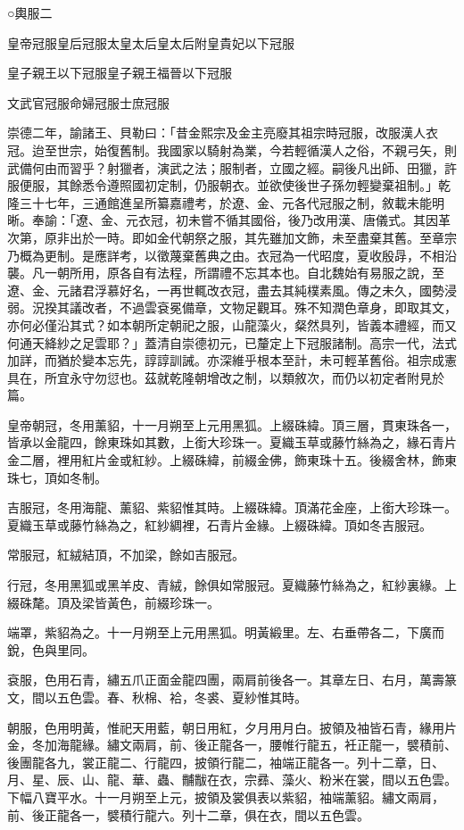 
\begin{pinyinscope}
○輿服二

皇帝冠服皇后冠服太皇太后皇太后附皇貴妃以下冠服

皇子親王以下冠服皇子親王福晉以下冠服

文武官冠服命婦冠服士庶冠服

崇德二年，諭諸王、貝勒曰：「昔金熙宗及金主亮廢其祖宗時冠服，改服漢人衣冠。迨至世宗，始復舊制。我國家以騎射為業，今若輕循漢人之俗，不親弓矢，則武備何由而習乎？射獵者，演武之法；服制者，立國之經。嗣後凡出師、田獵，許服便服，其餘悉令遵照國初定制，仍服朝衣。並欲使後世子孫勿輕變棄祖制。」乾隆三十七年，三通館進呈所纂嘉禮考，於遼、金、元各代冠服之制，敘載未能明晰。奉諭：「遼、金、元衣冠，初未嘗不循其國俗，後乃改用漢、唐儀式。其因革次第，原非出於一時。即如金代朝祭之服，其先雖加文飾，未至盡棄其舊。至章宗乃概為更制。是應詳考，以徵蔑棄舊典之由。衣冠為一代昭度，夏收殷冔，不相沿襲。凡一朝所用，原各自有法程，所謂禮不忘其本也。自北魏始有易服之說，至遼、金、元諸君浮慕好名，一再世輒改衣冠，盡去其純樸素風。傳之未久，國勢浸弱。況揆其議改者，不過雲袞冕備章，文物足觀耳。殊不知潤色章身，即取其文，亦何必僅沿其式？如本朝所定朝祀之服，山龍藻火，粲然具列，皆義本禮經，而又何通天絳紗之足雲耶？」蓋清自崇德初元，已釐定上下冠服諸制。高宗一代，法式加詳，而猶於變本忘先，諄諄訓誡。亦深維乎根本至計，未可輕革舊俗。祖宗成憲具在，所宜永守勿愆也。茲就乾隆朝增改之制，以類敘次，而仍以初定者附見於篇。

皇帝朝冠，冬用薰貂，十一月朔至上元用黑狐。上綴硃緯。頂三層，貫東珠各一，皆承以金龍四，餘東珠如其數，上銜大珍珠一。夏織玉草或藤竹絲為之，緣石青片金二層，裡用紅片金或紅紗。上綴硃緯，前綴金佛，飾東珠十五。後綴舍林，飾東珠七，頂如冬制。

吉服冠，冬用海龍、薰貂、紫貂惟其時。上綴硃緯。頂滿花金座，上銜大珍珠一。夏織玉草或藤竹絲為之，紅紗綢裡，石青片金緣。上綴硃緯。頂如冬吉服冠。

常服冠，紅絨結頂，不加梁，餘如吉服冠。

行冠，冬用黑狐或黑羊皮、青絨，餘俱如常服冠。夏織藤竹絲為之，紅紗裏緣。上綴硃氂。頂及梁皆黃色，前綴珍珠一。

端罩，紫貂為之。十一月朔至上元用黑狐。明黃緞里。左、右垂帶各二，下廣而銳，色與里同。

袞服，色用石青，繡五爪正面金龍四團，兩肩前後各一。其章左日、右月，萬壽篆文，間以五色雲。春、秋棉、袷，冬裘、夏紗惟其時。

朝服，色用明黃，惟祀天用藍，朝日用紅，夕月用月白。披領及袖皆石青，緣用片金，冬加海龍緣。繡文兩肩，前、後正龍各一，腰帷行龍五，衽正龍一，襞積前、後團龍各九，裳正龍二、行龍四，披領行龍二，袖端正龍各一。列十二章，日、月、星、辰、山、龍、華、蟲、黼黻在衣，宗彞、藻火、粉米在裳，間以五色雲。下幅八寶平水。十一月朔至上元，披領及裳俱表以紫貂，袖端薰貂。繡文兩肩，前、後正龍各一，襞積行龍六。列十二章，俱在衣，間以五色雲。


\end{pinyinscope}
